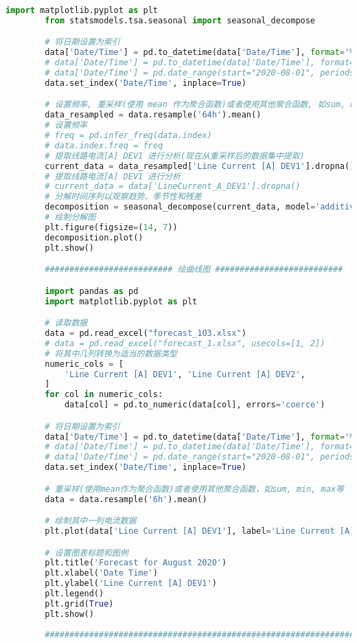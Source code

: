 \documentclass[withoutpreface,bwprint]{cumcmthesis}  %
\begin{document}
\begin{appendices}
\begin{lstlisting}[language=python]
        import matplotlib.pyplot as plt
        from statsmodels.tsa.seasonal import seasonal_decompose

        # 将日期设置为索引
        data['Date/Time'] = pd.to_datetime(data['Date/Time'], format='%Y/%m/%d %H:%M:%S', errors='coerce')
        # data['Date/Time'] = pd.to_datetime(data['Date/Time'], format='%d.%m.%Y. %H:%M:%S', errors='coerce')
        # data['Date/Time'] = pd.date_range(start="2020-08-01", periods=4707, freq='9min')
        data.set_index('Date/Time', inplace=True)

        # 设置频率, 重采样(使用 mean 作为聚合函数)或者使用其他聚合函数, 如sum, min, max等
        data_resampled = data.resample('64h').mean()    
        # 设置频率
        # freq = pd.infer_freq(data.index)  
        # data.index.freq = freq
        # 提取线路电流[A] DEV1 进行分析(现在从重采样后的数据集中提取) 
        current_data = data_resampled['Line Current [A] DEV1'].dropna()
        # 提取线路电流[A] DEV1 进行分析
        # current_data = data['LineCurrent_A_DEV1'].dropna()
        # 分解时间序列以观察趋势、季节性和残差
        decomposition = seasonal_decompose(current_data, model='additive', period=int(31 * 3 / 16))
        # 绘制分解图
        plt.figure(figsize=(14, 7))
        decomposition.plot()
        plt.show()

        ########################## 绘曲线图 ##########################

        import pandas as pd
        import matplotlib.pyplot as plt

        # 读取数据
        data = pd.read_excel("forecast_103.xlsx")
        # data = pd.read_excel("forecast_1.xlsx", usecols=[1, 2])
        # 将其中几列转换为适当的数据类型
        numeric_cols = [
            'Line Current [A] DEV1', 'Line Current [A] DEV2', 
        ]
        for col in numeric_cols:
            data[col] = pd.to_numeric(data[col], errors='coerce')

        # 将日期设置为索引
        data['Date/Time'] = pd.to_datetime(data['Date/Time'], format='%Y/%m/%d %H:%M:%S', errors='coerce')
        # data['Date/Time'] = pd.to_datetime(data['Date/Time'], format='%d.%m.%Y. %H:%M:%S', errors='coerce')
        # data['Date/Time'] = pd.date_range(start="2020-08-01", periods=4707, freq='9min')
        data.set_index('Date/Time', inplace=True)

        # 重采样(使用mean作为聚合函数)或者使用其他聚合函数，如sum, min, max等
        data = data.resample('6h').mean()    

        # 绘制其中一列电流数据
        plt.plot(data['Line Current [A] DEV1'], label='Line Current [A] DEV1', marker='o')

        # 设置图表标题和图例
        plt.title('Forecast for August 2020')
        plt.xlabel('Date Time')
        plt.ylabel('Line Current [A] DEV1')
        plt.legend()
        plt.grid(True)
        plt.show()
        
        #####################################################################################
		\end{lstlisting}
	\end{appendices}
	
\end{document}
